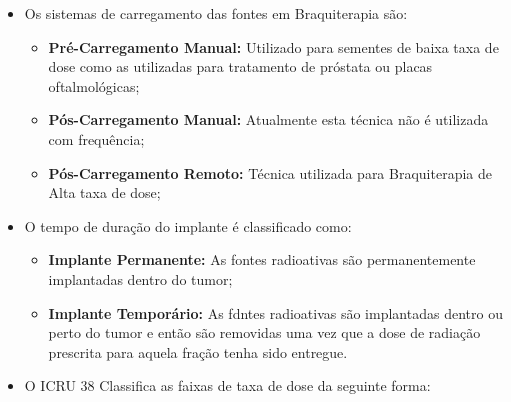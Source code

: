 \documentclass[11pt,a4paper]{article}
\newcounter{exemplo}
\begin{document}
\begin{exemplo}[Braquiterapia]
\begin{itemize}
        \item Os sistemas de carregamento das fontes em Braquiterapia são:
        
            \begin{itemize}[label=\textcolor{CarnationPink}{\textopenbullet}]
                \item \textcolor{CarnationPink}{\textbf{Pré-Carregamento Manual:}} Utilizado para sementes de baixa taxa de dose como as utilizadas para tratamento de próstata ou placas oftalmológicas;
                \item \textcolor{CarnationPink}{\textbf{Pós-Carregamento Manual:}}  Atualmente esta técnica não é utilizada com frequência;
                \item \textcolor{CarnationPink}{\textbf{Pós-Carregamento Remoto:}} Técnica utilizada para Braquiterapia de Alta taxa de dose;
            \end{itemize}

        \item O tempo de duração do implante é classificado como:
        
            \begin{itemize}[label=\textcolor{CarnationPink}{\textopenbullet}]
                \item \textcolor{CarnationPink}{\textbf{Implante Permanente:}} As fontes radioativas são permanentemente implantadas dentro do tumor;
                \item \textcolor{CarnationPink}{\textbf{Implante Temporário:}} As fdntes radioativas são implantadas dentro ou perto do tumor e então são removidas uma vez que a dose de radiação prescrita para aquela fração tenha sido entregue.
            \end{itemize}

        \item O ICRU 38 Classifica as faixas de taxa de dose da seguinte forma:
        

\end{itemize}
\end{exemplo}
\end{document}
